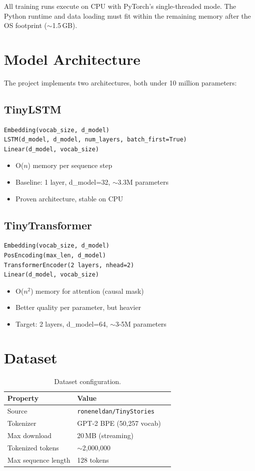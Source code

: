 \documentclass[11pt,a4paper]{article}
\begin{document}
All training runs execute on CPU with PyTorch's single-threaded mode. The Python runtime and data loading must fit within the remaining memory after the OS footprint ($\sim$1.5\,GB).

\section{Model Architecture}

The project implements two architectures, both under 10 million parameters:

\subsection{TinyLSTM}
\begin{lstlisting}
Embedding(vocab_size, d_model)
LSTM(d_model, d_model, num_layers, batch_first=True)
Linear(d_model, vocab_size)
\end{lstlisting}
\begin{itemize}[nosep]
  \item O($n$) memory per sequence step
  \item Baseline: 1 layer, d\_model=32, $\sim$3.3M parameters
  \item Proven architecture, stable on CPU
\end{itemize}

\subsection{TinyTransformer}
\begin{lstlisting}
Embedding(vocab_size, d_model)
PosEncoding(max_len, d_model)
TransformerEncoder(2 layers, nhead=2)
Linear(d_model, vocab_size)
\end{lstlisting}
\begin{itemize}[nosep]
  \item O($n^2$) memory for attention (causal mask)
  \item Better quality per parameter, but heavier
  \item Target: 2 layers, d\_model=64, $\sim$3-5M parameters
\end{itemize}

\section{Dataset}

\begin{table}[h]
\centering
\begin{tabular}{@{}llr@{}}
\toprule
\textbf{Property} & \textbf{Value} \\
\midrule
Source & \texttt{roneneldan/TinyStories} \\
Tokenizer & GPT-2 BPE (50,257 vocab) \\
Max download & 20\,MB (streaming) \\
Tokenized tokens & $\sim$2,000,000 \\
Max sequence length & 128 tokens \\
\bottomrule
\end{tabular}
\caption{Dataset configuration.}
\end{table}
\end{document}
